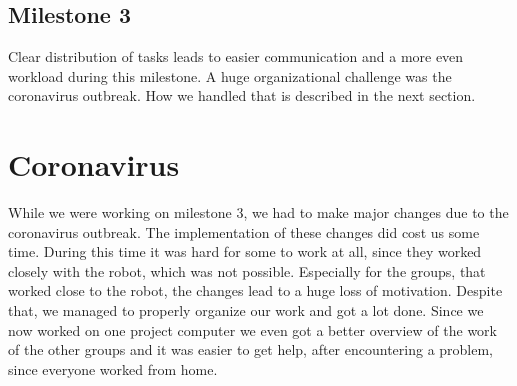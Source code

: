 \documentclass[main.tex]{subfiles}
\begin{document}
		\subsection{Milestone 3}
		Clear distribution of tasks leads to easier communication and a more even workload during this milestone.
		A huge organizational challenge was the coronavirus outbreak. How we handled that is described in the next section. 
		
		\section{Coronavirus}
	  	While we were working on milestone 3, we had to make major changes due to the coronavirus outbreak. The implementation of these changes did cost us some time. During this time it was hard for some to work at all, since they worked closely with the robot, which was not possible.
	  	Especially for the groups, that worked close to the robot, the changes lead to a huge loss of motivation.
	  	Despite that, we managed to properly organize our work and got a lot done.
	  	Since we now worked on one project computer we even got a better overview of the work of the other groups and it was easier to get help, after encountering a problem, since everyone worked from home.

	\endgroup
\end{document}
